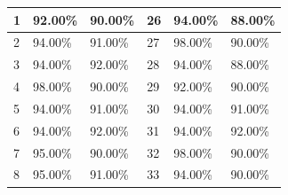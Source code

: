 \begin{table}[H]
\begin{tabular}{|l|l|l|l|l|l|}
			1  & 92.00\%                                                               & 90.00\%                                                                 & 26 & 94.00\%                                                                & 88.00\%                                                                 \\ \hline
			2  & 94.00\%                                                               & 91.00\%                                                                 & 27 & 98.00\%                                                                & 90.00\%                                                                 \\ \hline
			3  & 94.00\%                                                               & 92.00\%                                                                 & 28 & 94.00\%                                                                & 88.00\%                                                                 \\ \hline
			4  & 98.00\%                                                               & 90.00\%                                                                 & 29 & 92.00\%                                                                & 90.00\%                                                                 \\ \hline
			5  & 94.00\%                                                               & 91.00\%                                                                 & 30 & 94.00\%                                                                & 91.00\%                                                                 \\ \hline
			6  & 94.00\%                                                               & 92.00\%                                                                 & 31 & 94.00\%                                                                & 92.00\%                                                                 \\ \hline
			7  & 95.00\%                                                               & 90.00\%                                                                 & 32 & 98.00\%                                                                & 90.00\%                                                                 \\ \hline
			8  & 95.00\%                                                               & 91.00\%                                                                 & 33 & 94.00\%                                                                & 90.00\%                                                                 \\ \hline

\end{tabular}
\end{table}
